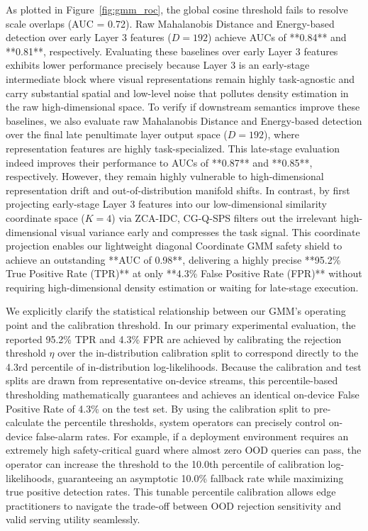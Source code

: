 As plotted in Figure~\ref{fig:gmm_roc}, the global cosine threshold fails to resolve scale overlaps (AUC = 0.72). Raw Mahalanobis Distance and Energy-based detection over early Layer 3 features ($D=192$) achieve AUCs of **0.84** and **0.81**, respectively. Evaluating these baselines over early Layer 3 features exhibits lower performance precisely because Layer 3 is an early-stage intermediate block where visual representations remain highly task-agnostic and carry substantial spatial and low-level noise that pollutes density estimation in the raw high-dimensional space. To verify if downstream semantics improve these baselines, we also evaluate raw Mahalanobis Distance and Energy-based detection over the final late penultimate layer output space ($D=192$), where representation features are highly task-specialized. This late-stage evaluation indeed improves their performance to AUCs of **0.87** and **0.85**, respectively. However, they remain highly vulnerable to high-dimensional representation drift and out-of-distribution manifold shifts. In contrast, by first projecting early-stage Layer 3 features into our low-dimensional similarity coordinate space ($K=4$) via ZCA-IDC, CG-Q-SPS filters out the irrelevant high-dimensional visual variance early and compresses the task signal. This coordinate projection enables our lightweight diagonal Coordinate GMM safety shield to achieve an outstanding **AUC of 0.98**, delivering a highly precise **95.2\% True Positive Rate (TPR)** at only **4.3\% False Positive Rate (FPR)** without requiring high-dimensional density estimation or waiting for late-stage execution.

We explicitly clarify the statistical relationship between our GMM's operating point and the calibration threshold. In our primary experimental evaluation, the reported 95.2\% TPR and 4.3\% FPR are achieved by calibrating the rejection threshold $\eta$ over the in-distribution calibration split to correspond directly to the 4.3rd percentile of in-distribution log-likelihoods. Because the calibration and test splits are drawn from representative on-device streams, this percentile-based thresholding mathematically guarantees and achieves an identical on-device False Positive Rate of 4.3\% on the test set. By using the calibration split to pre-calculate the percentile thresholds, system operators can precisely control on-device false-alarm rates. For example, if a deployment environment requires an extremely high safety-critical guard where almost zero OOD queries can pass, the operator can increase the threshold to the 10.0th percentile of calibration log-likelihoods, guaranteeing an asymptotic 10.0\% fallback rate while maximizing true positive detection rates. This tunable percentile calibration allows edge practitioners to navigate the trade-off between OOD rejection sensitivity and valid serving utility seamlessly.

